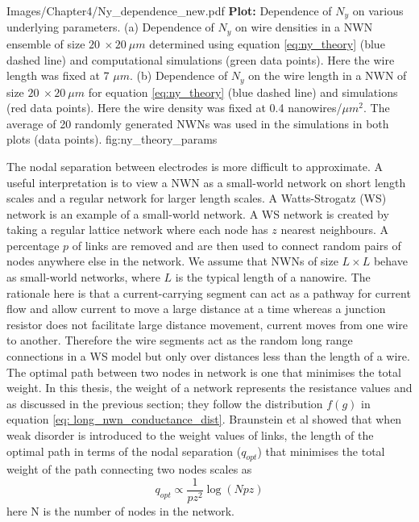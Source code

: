 {Images/Chapter4/Ny_dependence_new.pdf}
{\textbf{Plot:} Dependence of $N_y$ on various underlying parameters.}
{(a) Dependence of $N_y$ on wire densities in a NWN ensemble of size $20~ \times 20~ \mu m$ determined using equation \ref{eq:ny_theory} (blue dashed line) and computational simulations (green data points). Here the wire length was fixed at 7 $\mu m$. (b) Dependence of $N_y$ on the wire length in a NWN of size $20~ \times 20~ \mu m$ for equation \ref{eq:ny_theory} (blue dashed line) and simulations (red data points). Here the wire density was fixed at 0.4 nanowires/$\mu m^2$. The average of 20 randomly generated NWNs was used in the simulations in both plots (data points).}
{fig:ny_theory_params}

The nodal separation between electrodes is more difficult to approximate. A useful interpretation is to view a NWN as a small-world network\cite{watts1999_2} on short length scales and a regular network for larger length scales. A Watts-Strogatz (WS) network is an example of a small-world network\cite{watts1998}. A WS network is created by taking a regular lattice network where each node has $z$ nearest neighbours. A percentage $p$ of links are removed and are then used to connect random pairs of nodes anywhere else in the network. We assume that NWNs of size $L\times L$ behave as small-world networks, where $L$ is the typical length of a nanowire. The rationale here is that a current-carrying segment can act as a pathway for current flow and allow current to move a large distance at a time whereas a junction resistor does not facilitate large distance movement, current moves from one wire to another. Therefore the wire segments act as the random long range connections in a WS model but only over distances less than the length of a wire. The optimal path between two nodes in network is one that minimises the total weight. In this thesis, the weight of a network represents the resistance values and as discussed in the previous section; they follow the distribution $f(g)$ in equation \ref{eq: long_nwn_conductance_dist}. Braunstein et al\cite{braunstein2003} showed that when weak disorder is introduced to the weight values of links, the length of the optimal path in terms of the nodal separation ($q_{opt}$) that minimises the total weight of the path connecting two nodes scales as
\begin{equation}
q_{opt} \propto \frac{1}{p z^2} \log(N p z) 
\label{eq:small_world_scale}
\end{equation} 
here N is the number of nodes in the network. 

